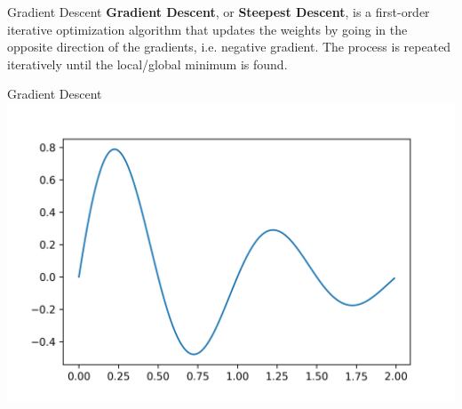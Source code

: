\documentclass{beamer}
\begin{document}
\begin{frame}[fragile]{Gradient Descent}
    \textbf{Gradient Descent}, or \textbf{Steepest Descent}, is a first-order iterative optimization algorithm that updates the weights by going in the opposite direction of the gradients, i.e. negative gradient. The process is repeated iteratively until the local/global minimum is found.
\end{frame}
\begin{frame}[fragile]{Gradient Descent}
    \includegraphics[width=\textwidth,height=\textheight,keepaspectratio]{figures/MinimaExample.png}
\end{frame}
\end{document}

